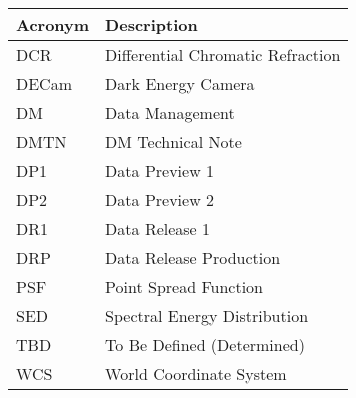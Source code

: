\addtocounter{table}{-1}
\begin{longtable}{p{}p{}}\hline
\textbf{Acronym} & \textbf{Description}  \\\hline

DCR & Differential Chromatic Refraction \\\hline
DECam & Dark Energy Camera \\\hline
DM & Data Management \\\hline
DMTN & DM Technical Note \\\hline
DP1 & Data Preview 1 \\\hline
DP2 & Data Preview 2 \\\hline
DR1 & Data Release 1 \\\hline
DRP & Data Release Production \\\hline
PSF & Point Spread Function \\\hline
SED & Spectral Energy Distribution \\\hline
TBD & To Be Defined (Determined) \\\hline
WCS & World Coordinate System \\\hline
\end{longtable}

